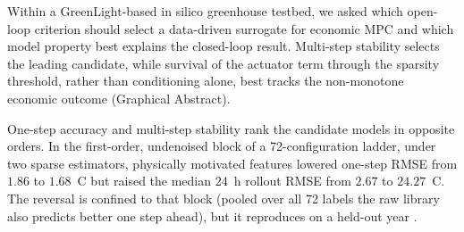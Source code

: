 Within a GreenLight-based in silico greenhouse testbed, we asked which open-loop
criterion should select a data-driven surrogate for economic MPC and which model
property best explains the closed-loop result. Multi-step stability selects the
leading candidate, while survival of the actuator term through the sparsity
threshold, rather than conditioning alone, best tracks the non-monotone economic
outcome (Graphical Abstract).

One-step accuracy and multi-step stability rank the candidate
models in opposite orders. In the first-order, undenoised block of a
72-configuration ladder, under two sparse estimators, physically motivated
features lowered one-step RMSE from $1.86$ to $1.68$~\textdegree C but raised
the median 24~h rollout RMSE from $2.67$ to $24.27$~\textdegree C. The reversal
is confined to that block (pooled over all 72 labels the raw library also predicts
better one step ahead), but it reproduces on a held-out year
\cite{lambert2020,wei2024,gevers1993,vandenhof1995,yonezawa2026}.

